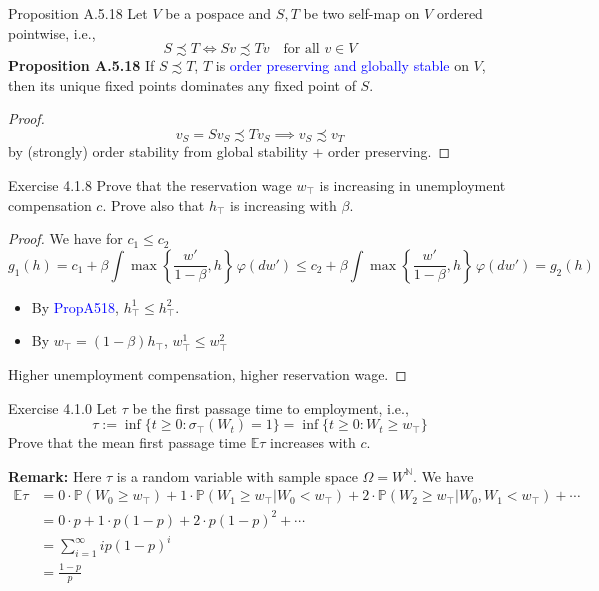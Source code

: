 \begin{frame}{Proposition A.5.18}
Let $V$ be a pospace and $S,T$ be two self-map on $V$ ordered pointwise, i.e.,
$$
S\precsim T\iff Sv\precsim Tv\quad \text{for all $v\in V$}
$$
\textbf{Proposition A.5.18}
    If $S\precsim T$, $T$ is \textcolor{blue}{order preserving and globally stable} on $V$, then its unique fixed points dominates any fixed point of $S$.
\begin{proof}
   $$
   v_S = Sv_S\precsim Tv_S\implies v_S\precsim v_T
   $$
   by (strongly) order stability from global stability + order preserving.
\end{proof}
    
\end{frame}

\begin{frame}{Exercise 4.1.8}
Prove that the reservation wage $w_\top$ is increasing in unemployment compensation $c$. Prove also that $h_\top$ is increasing with $\beta$.
\begin{proof}
    We have for $c_1\le c_2$
    $$
    g_1(h) = c_1 + \beta \int \max\left\{\frac{w'}{1-\beta}, h\right\}\,\varphi(dw')\le c_2 + \beta \int \max\left\{\frac{w'}{1-\beta}, h\right\}\,\varphi(dw') = g_2(h)
    $$
\begin{itemize}
    \item By \textcolor{blue}{PropA518}, $h^1_\top \le h^2_\top$.
    \item By $w_\top = (1-\beta)h_\top$, $w^1_\top\le w^2_\top$
\end{itemize}
Higher unemployment compensation, higher reservation wage.
\end{proof}


\end{frame}

\begin{frame}{Exercise 4.1.0}
Let $\tau$ be the first passage time to employment, i.e.,
$$
\tau:= \inf\{t\ge 0: \sigma_\top (W_t) = 1\} = \inf\{t\ge 0: W_t\ge w_\top\}
$$
Prove that the mean first passage time $\mathbb{E}\tau$ increases with $c$.

\textbf{Remark:} Here $\tau$ is a random variable with sample space $\Omega = W^\mathbb{N}$. We have
\begin{align*}
    \mathbb{E}\tau  &= 0\cdot \mathbb{P}(W_0\ge w_\top) + 1\cdot \mathbb{P}(W_1\ge w_\top
    |W_0< w_\top)+ 2\cdot \mathbb{P}(W_2\ge w_\top|W_0,W_1<w_\top)+\cdots\\
    &= 0\cdot p + 1\cdot p(1-p) + 2\cdot p(1-p)^2 + \cdots\\
    &= \sum_{i=1}^\infty ip(1-p)^i\tag{mean of Geometric distribution}\\
    &=\frac{1-p}{p}
\end{align*}
\end{frame}

